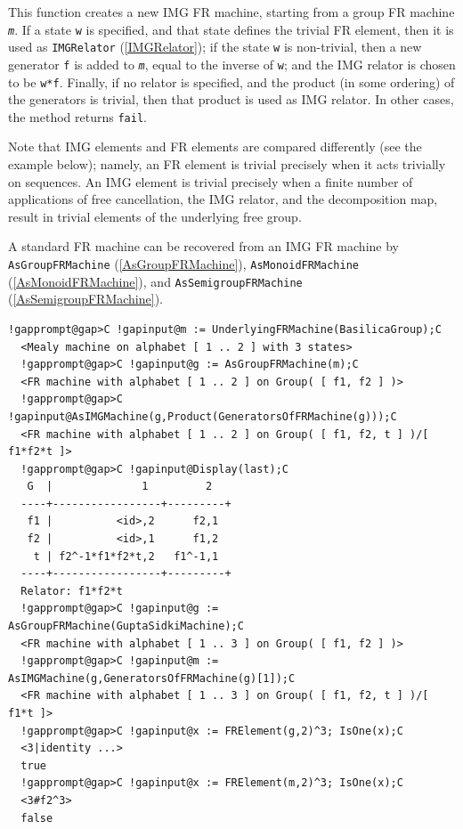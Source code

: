 \documentclass[a4paper,11pt]{report}
\begin{document}
{{{ This function creates a new IMG FR machine, starting from a group FR machine \mbox{\texttt{\mdseries\slshape m}}. If a state \texttt{w} is specified, and that state defines the trivial FR element, then it is used
as \texttt{IMGRelator} (\ref{IMGRelator}); if the state \texttt{w} is non-trivial, then a new generator \texttt{f} is added to \mbox{\texttt{\mdseries\slshape m}}, equal to the inverse of \texttt{w}; and the IMG relator is chosen to be \texttt{w*f}. Finally, if no relator is specified, and the product (in some ordering) of
the generators is trivial, then that product is used as IMG relator. In other
cases, the method returns \texttt{fail}. 

 Note that IMG elements and FR elements are compared differently (see the
example below); namely, an FR element is trivial precisely when it acts
trivially on sequences. An IMG element is trivial precisely when a finite
number of applications of free cancellation, the IMG relator, and the
decomposition map, result in trivial elements of the underlying free group. 

 A standard FR machine can be recovered from an IMG FR machine by \texttt{AsGroupFRMachine} (\ref{AsGroupFRMachine}), \texttt{AsMonoidFRMachine} (\ref{AsMonoidFRMachine}), and \texttt{AsSemigroupFRMachine} (\ref{AsSemigroupFRMachine}). 
\begin{Verbatim}[commandchars=!@C,fontsize=\small,frame=single,label=Example]
  !gapprompt@gap>C !gapinput@m := UnderlyingFRMachine(BasilicaGroup);C
  <Mealy machine on alphabet [ 1 .. 2 ] with 3 states>
  !gapprompt@gap>C !gapinput@g := AsGroupFRMachine(m);C
  <FR machine with alphabet [ 1 .. 2 ] on Group( [ f1, f2 ] )>
  !gapprompt@gap>C !gapinput@AsIMGMachine(g,Product(GeneratorsOfFRMachine(g)));C
  <FR machine with alphabet [ 1 .. 2 ] on Group( [ f1, f2, t ] )/[ f1*f2*t ]>
  !gapprompt@gap>C !gapinput@Display(last);C
   G  |              1         2
  ----+-----------------+---------+
   f1 |          <id>,2      f2,1
   f2 |          <id>,1      f1,2
    t | f2^-1*f1*f2*t,2   f1^-1,1
  ----+-----------------+---------+
  Relator: f1*f2*t
  !gapprompt@gap>C !gapinput@g := AsGroupFRMachine(GuptaSidkiMachine);C
  <FR machine with alphabet [ 1 .. 3 ] on Group( [ f1, f2 ] )>
  !gapprompt@gap>C !gapinput@m := AsIMGMachine(g,GeneratorsOfFRMachine(g)[1]);C
  <FR machine with alphabet [ 1 .. 3 ] on Group( [ f1, f2, t ] )/[ f1*t ]>
  !gapprompt@gap>C !gapinput@x := FRElement(g,2)^3; IsOne(x);C
  <3|identity ...>
  true
  !gapprompt@gap>C !gapinput@x := FRElement(m,2)^3; IsOne(x);C
  <3#f2^3>
  false
\end{Verbatim}
 }

}}
\end{document}
